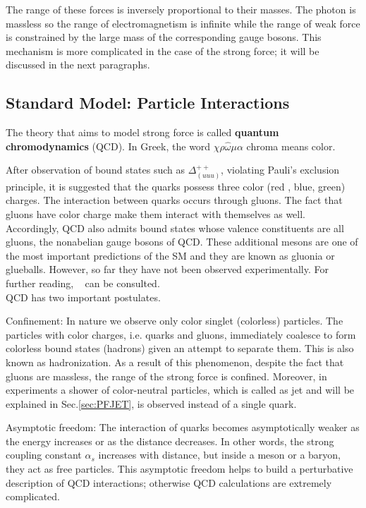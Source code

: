 The range of these forces is inversely proportional to their masses. The photon is massless so the range of electromagnetism is infinite while the range of weak force is constrained by the large mass of the corresponding gauge bosons. This mechanism is more complicated in the case of the strong force; it will be discussed in the next paragraphs.

\subsection{Standard Model: Particle Interactions}
\label{sec:StandardModelParticleInteractions}

The theory that aims to model strong force is called \textbf{quantum chromodynamics} (QCD). In Greek, the word $\chi\rho\hat{\omega}\mu\alpha$ chroma means color. 

After observation of bound states such as $\Delta^{++}_{(uuu)}$, violating Pauli\textquoteright s exclusion principle, it is suggested that the quarks possess three color (red , blue, green) charges. The interaction between quarks occurs through gluons. The fact that gluons have color charge make them interact with themselves as well. Accordingly, QCD also admits bound states whose valence constituents are all gluons, the non\-abelian gauge bosons of QCD. These additional mesons are one of the most important predictions of the SM and they are known as gluonia or glueballs. However, so far they have not been observed experimentally. For further reading, ~\cite{glueball1, glueball2} can be consulted.\\
QCD has two important postulates.

Confinement:
In nature we observe only color singlet (colorless) particles. The particles with color charges, i.e. quarks and gluons, immediately coalesce to form colorless bound states (hadrons) given an attempt to separate them. This is also known as hadronization. As a result of this phenomenon, despite the fact that gluons are massless, the range of the strong force is confined. Moreover, in experiments a shower of color-neutral particles, which is called as jet and will be explained in Sec.\ref{sec:PFJET}, is observed instead of a single quark.

Asymptotic freedom:
The interaction of quarks becomes asymptotically weaker as the energy increases or as the distance decreases. In other words, the strong coupling constant $\alpha_s$  increases with distance, but inside a meson or a baryon, they act as free particles. This asymptotic freedom helps to build a perturbative description of QCD interactions; otherwise QCD calculations are extremely complicated.

